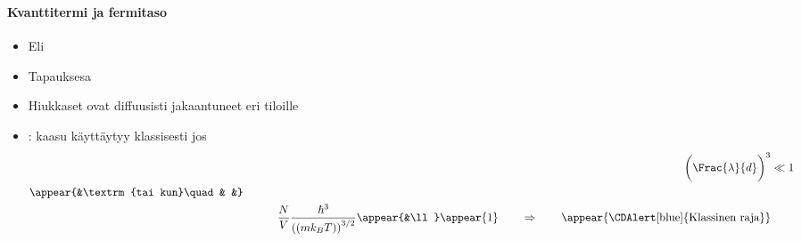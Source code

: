 \begin{frame}
\frametitle{\texorpdfstring{\culine[\sectiontitleulinecolor]{\sectiontitle}}{\sectiontitle} }
\framesubtitle{Kvanttitermi ja fermitaso}
\appear{}
\begin{itemize}
	\item Eli  

\item Tapauksesa   

\item Hiukkaset ovat diffuusisti jakaantuneet eri tiloille
\item {}: kaasu käyttäytyy klassisesti jos
\[
\begin{aligned}
& & \qquad \bigg( \Frac{\lambda}{d}  \bigg)^{3} &\ll 1  \\
\appear{&\textrm{tai kun}\quad& &} \\
& & \qquad \frac{N}{V} \frac{\hbar^{3}}{ \textrm{((}m k_{B} T \textrm{))}^{3 / 2}} \appear{&\ll} \appear{1} \qquad \Rightarrow \qquad \text {\appear{\CDAlert[blue]{Klassinen raja}}} \\
\end{aligned}
\]
\end{itemize}

\endofslide 
\end{frame}

